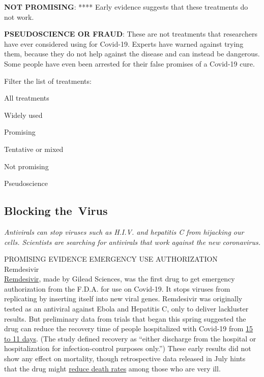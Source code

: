 \textbf{NOT PROMISING}: **** Early evidence suggests that these
treatments do not work.

\textbf{PSEUDOSCIENCE OR FRAUD}: These are not treatments that
researchers have ever considered using for Covid-19. Experts have warned
against trying them, because they do not help against the disease and
can instead be dangerous. Some people have even been arrested for their
false promises of a Covid-19 cure.

Filter the list of treatments:

All treatments

Widely used

Promising

Tentative or mixed

Not promising

Pseudoscience

\hypertarget{blocking-the-virus}{%
\subsection{Blocking the~Virus}\label{blocking-the-virus}}

\emph{Antivirals can stop viruses such as H.I.V. and hepatitis C from
hijacking our cells. Scientists are searching for antivirals that work
against the new coronavirus.}

PROMISING EVIDENCE EMERGENCY USE AUTHORIZATION\\
Remdesivir\\
\href{https://www.nytimes3xbfgragh.onion/2020/05/23/health/coronavirus-remdesivir.html}{Remdesivir},
made by Gilead Sciences, was the first drug to get emergency
authorization from the F.D.A. for use on Covid-19. It stops viruses from
replicating by inserting itself into new viral genes. Remdesivir was
originally tested as an antiviral against Ebola and Hepatitis C, only to
deliver lackluster results. But preliminary data from trials that began
this spring suggested the drug can reduce the recovery time of people
hospitalized with Covid-19 from
\href{https://www.nejm.org/doi/full/10.1056/NEJMoa2007764}{15 to 11
days}. (The study defined recovery as ``either discharge from the
hospital or hospitalization for infection-control purposes only.'')
These early results did not show any effect on mortality, though
retrospective data released in July hints that the drug might
\href{https://www.gilead.com/news-and-press/press-room/press-releases/2020/7/gilead-presents-additional-data-on-investigational-antiviral-remdesivir-for-the-treatment-of-covid-19}{reduce
death rates} among those who are very ill.


